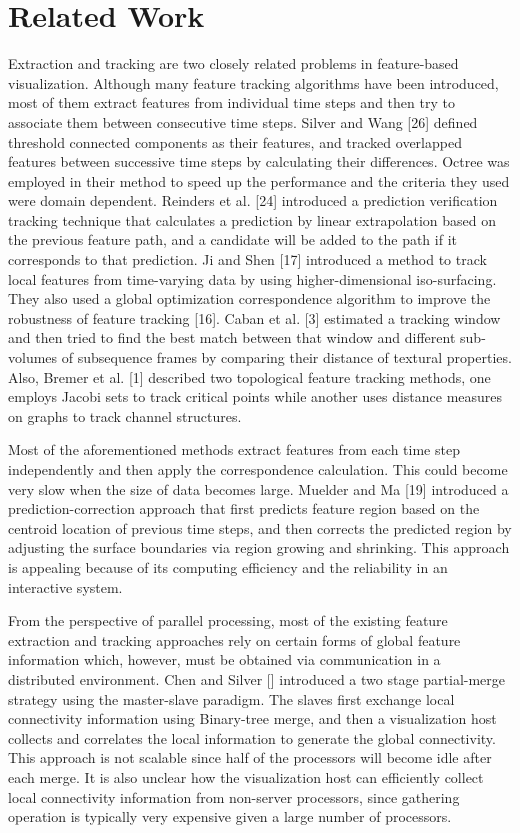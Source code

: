 \documentclass[10pt, conference, compsocconf]{IEEEtran}
\begin{document}

\section{Related Work}
Extraction and tracking are two closely related problems in feature-based visualization. Although many feature tracking algorithms have been introduced, most of them extract features from individual time steps and then try to associate them between consecutive time steps. Silver and Wang [26] defined threshold connected components as their features, and tracked overlapped features between successive time steps by calculating their differences. Octree was employed in their method to speed up the performance and the criteria they used were domain dependent. Reinders et al. [24] introduced a prediction verification tracking technique that calculates a prediction by linear extrapolation based on the previous feature path, and a candidate will be added to the path if it corresponds to that prediction. Ji and Shen [17] introduced a method to track local features from time-varying data by using higher-dimensional iso-surfacing. They also used a global optimization correspondence algorithm to improve the robustness of feature tracking [16]. Caban et al. [3] estimated a tracking window and then tried to find the best match between that window and different sub-volumes of subsequence frames by comparing their distance of textural properties.  Also, Bremer et al. [1] described two topological feature tracking methods, one employs Jacobi sets to track critical points while another uses distance measures on graphs to track channel structures.

Most of the aforementioned methods extract features from each time step independently and then apply the correspondence calculation. This could become very slow when the size of data becomes large. Muelder and Ma [19] introduced a prediction-correction approach that first predicts feature region based on the centroid location of previous time steps, and then corrects the predicted region by adjusting the surface boundaries via region growing and shrinking. This approach is appealing because of its computing efficiency and the reliability in an interactive system.

From the perspective of parallel processing, most of the existing feature extraction and tracking approaches rely on certain forms of global feature information which, however, must be obtained via communication in a distributed environment. Chen and Silver [] introduced a two stage partial-merge strategy using the master-slave paradigm. The slaves first exchange local connectivity information using Binary-tree merge, and then a visualization host collects and correlates the local information to generate the global connectivity. This approach is not scalable since half of the processors will become idle after each merge. It is also unclear how the visualization host can efficiently collect local connectivity information from non-server processors, since gathering operation is typically very expensive given a large number of processors.
\end{document}
